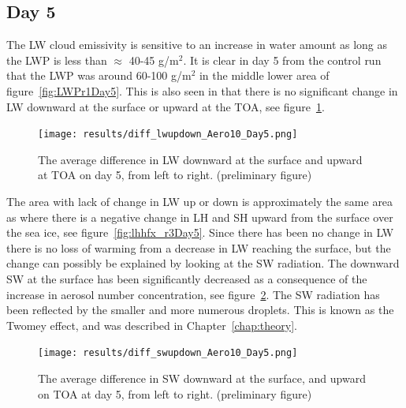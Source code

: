 \subsection{Day 5}
The LW cloud emissivity is sensitive to an increase in water amount as long as the LWP is less than $\approx$ 40-45 g/m$^2$. It is clear in day 5 from the control run that the LWP was around 60-100 g/m$^2$ in the middle lower area of figure~\ref{fig:LWPr1Day5}.%
This is also seen in that there is no significant change in LW downward at the surface or upward at the TOA, see figure~\ref{fig:lwup_down_r3Day5}.
\begin{figure}[h!]
\centering
\texttt{[image: results/diff\_lwupdown\_Aero10\_Day5.png]}
\caption{The average difference in LW downward at the surface and upward at TOA on day 5, from left to right. (preliminary figure)}
\label{fig:lwup_down_r3Day5}
\end{figure}
The area with lack of change in LW up or down is approximately the same area as where there is a negative change in LH and SH upward from the surface over the sea ice, see figure~\ref{fig:lhhfx_r3Day5}. Since there has been no change in LW there is no loss of warming from a decrease in LW reaching the surface, but the change can possibly be explained by looking at the SW radiation. The downward SW at the surface has been significantly decreased as a consequence of the increase in aerosol number concentration, see figure~\ref{fig:swup_down_r3Day5}. The SW radiation has been reflected by the smaller and more numerous droplets. This is known as the Twomey effect, and was described in Chapter~\ref{chap:theory}. 
\begin{figure}[h!]
\centering
\texttt{[image: results/diff\_swupdown\_Aero10\_Day5.png]}
\caption{The average difference in SW downward at the surface, and upward on TOA at day 5, from left to right. (preliminary figure)}
\label{fig:swup_down_r3Day5}
\end{figure}

